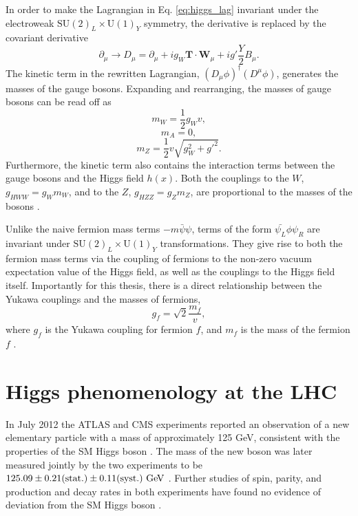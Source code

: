 In order to make the Lagrangian in Eq. \ref{eq:higgs_lag} invariant under the electroweak
$\text{SU}(2)_L \times \text{U}(1)_Y$ symmetry, the derivative is replaced by the covariant
derivative \cite{Thomson:2013zua}
\begin{equation}
\partial_\mu \rightarrow D_\mu = \partial_\mu + i g_W \mathbf{T} \cdot \mathbf{W}_\mu
+ i g' \frac{Y}{2} B_\mu.
\end{equation}
The kinetic term in the rewritten Lagrangian, $(D_\mu \phi)^\dag (D^\mu \phi)$, generates the
masses of the gauge bosons. Expanding and rearranging, the masses of gauge bosons can be read off as
\begin{equation}
m_W = \frac{1}{2} g_W v,
\end{equation}
\begin{equation}
m_A = 0,
\end{equation}
\begin{equation}
m_Z = \frac{1}{2}v\sqrt{g_W^2 + g'^2}.
\end{equation}
Furthermore, the kinetic term also contains the interaction terms between the gauge bosons
and the Higgs field $h(x)$. Both the couplings to the $W$, $g_{HWW}=g_W m_W$, and to the $Z$,
$g_{HZZ} = g_Z m_Z$, are proportional to the masses of the bosons \cite{Thomson:2013zua}.

Unlike the naive fermion mass terms $-m \bar{\psi}\psi$, terms of the form $\bar{\psi_L}\phi\psi_R$ 
are invariant under $\text{SU}(2)_L \times \text{U}(1)_Y$ transformations. They give rise to both the fermion mass terms
via the coupling of fermions to the non-zero vacuum expectation value of the Higgs field,
as well as the couplings to the Higgs field itself. Importantly for this thesis, there is 
a direct relationship between the Yukawa couplings and the
masses of fermions,
\begin{equation}
g_f = \sqrt{2}\frac{m_f}{v},
\end{equation}
where $g_f$ is the Yukawa coupling for fermion $f$, and $m_f$ is the mass of the fermion $f$ 
\cite{Thomson:2013zua}.

\section{Higgs phenomenology at the LHC}

In July 2012 the ATLAS and CMS experiments reported an observation of a new elementary particle with a
mass of approximately 125 GeV, consistent with the properties of the SM Higgs boson
\cite{Aad:2012tfa, Chatrchyan:2012xdj}. The mass of the new boson was later measured
jointly by the two experiments to be $125.09 \pm 0.21 (\text{stat.}) \pm 0.11 (\text{syst.})~\text{Ge\kern -0.1em V}$
\cite{Aad:2015zhl}. Further studies of spin, parity, and production
and decay rates in both experiments have found no evidence of deviation from the SM
Higgs boson \cite{Aad:2015mxa, PhysRevD.92.012004, Khachatryan:2016vau, Aad:2019mbh}.

